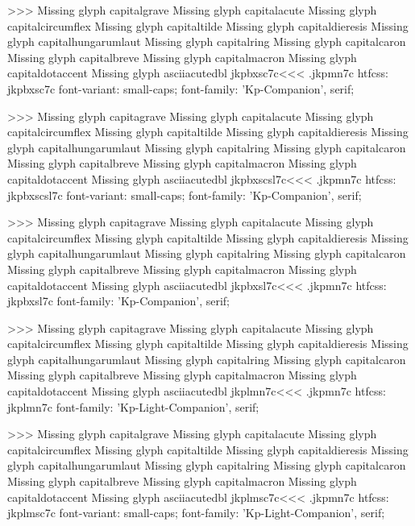 >>>
Missing glyph	capitalgrave
Missing glyph	capitalacute
Missing glyph	capitalcircumflex
Missing glyph	capitaltilde
Missing glyph	capitaldieresis
Missing glyph	capitalhungarumlaut
Missing glyph	capitalring
Missing glyph	capitalcaron
Missing glyph	capitalbreve
Missing glyph	capitalmacron
Missing glyph	capitaldotaccent
Missing glyph	asciiacutedbl
\<jkpbxsc7c\><<<
.jkpmn7c
htfcss:  jkpbxsc7c  font-variant: small-caps; font-family: 'Kp-Companion', serif;

>>>
Missing glyph	capitagrave
Missing glyph	capitalacute
Missing glyph	capitalcircumflex
Missing glyph	capitaltilde
Missing glyph	capitaldieresis
Missing glyph	capitalhungarumlaut
Missing glyph	capitalring
Missing glyph	capitalcaron
Missing glyph	capitalbreve
Missing glyph	capitalmacron
Missing glyph	capitaldotaccent
Missing glyph	asciiacutedbl
\<jkpbxscsl7c\><<<
.jkpmn7c
htfcss:  jkpbxscsl7c  font-variant: small-caps; font-family: 'Kp-Companion', serif;

>>>
Missing glyph	capitagrave
Missing glyph	capitalacute
Missing glyph	capitalcircumflex
Missing glyph	capitaltilde
Missing glyph	capitaldieresis
Missing glyph	capitalhungarumlaut
Missing glyph	capitalring
Missing glyph	capitalcaron
Missing glyph	capitalbreve
Missing glyph	capitalmacron
Missing glyph	capitaldotaccent
Missing glyph	asciiacutedbl
\<jkpbxsl7c\><<<
.jkpmn7c
htfcss:  jkpbxsl7c  font-family: 'Kp-Companion', serif;

>>>
Missing glyph	capitagrave
Missing glyph	capitalacute
Missing glyph	capitalcircumflex
Missing glyph	capitaltilde
Missing glyph	capitaldieresis
Missing glyph	capitalhungarumlaut
Missing glyph	capitalring
Missing glyph	capitalcaron
Missing glyph	capitalbreve
Missing glyph	capitalmacron
Missing glyph	capitaldotaccent
Missing glyph	asciiacutedbl
\<jkplmn7c\><<<
.jkpmn7c
htfcss:  jkplmn7c  font-family: 'Kp-Light-Companion', serif;

>>>
Missing glyph	capitalgrave
Missing glyph	capitalacute
Missing glyph	capitalcircumflex
Missing glyph	capitaltilde
Missing glyph	capitaldieresis
Missing glyph	capitalhungarumlaut
Missing glyph	capitalring
Missing glyph	capitalcaron
Missing glyph	capitalbreve
Missing glyph	capitalmacron
Missing glyph	capitaldotaccent
Missing glyph	asciiacutedbl
\<jkplmsc7c\><<<
.jkpmn7c
htfcss:  jkplmsc7c  font-variant: small-caps; font-family: 'Kp-Light-Companion', serif;

